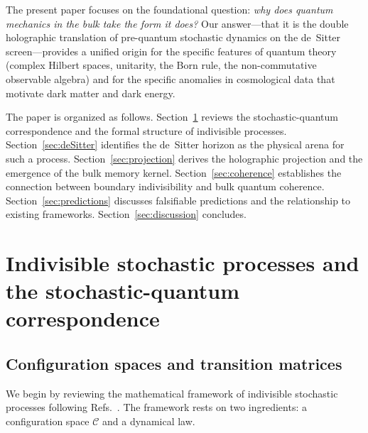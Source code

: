 \documentclass[aps,prd,twocolumn,superscriptaddress,nofootinbib]{revtex4-2}
\begin{document}
The present paper focuses on the foundational question: \emph{why does quantum mechanics in the bulk take the form it does?} Our answer---that it is the double holographic translation of pre-quantum stochastic dynamics on the de~Sitter screen---provides a unified origin for the specific features of quantum theory (complex Hilbert spaces, unitarity, the Born rule, the non-commutative observable algebra) and for the specific anomalies in cosmological data that motivate dark matter and dark energy.

The paper is organized as follows. Section~\ref{sec:SQC} reviews the stochastic-quantum correspondence and the formal structure of indivisible processes. Section~\ref{sec:deSitter} identifies the de~Sitter horizon as the physical arena for such a process. Section~\ref{sec:projection} derives the holographic projection and the emergence of the bulk memory kernel. Section~\ref{sec:coherence} establishes the connection between boundary indivisibility and bulk quantum coherence. Section~\ref{sec:predictions} discusses falsifiable predictions and the relationship to existing frameworks. Section~\ref{sec:discussion} concludes.



\section{Indivisible stochastic processes and the stochastic-quantum correspondence}
\label{sec:SQC}

\subsection{Configuration spaces and transition matrices}

We begin by reviewing the mathematical framework of indivisible stochastic processes following Refs.~\cite{Barandes2025SQC,Barandes2025SQT,Barandes2025QSIP}. The framework rests on two ingredients: a configuration space $\mathcal{C}$ and a dynamical law.
\end{document}
